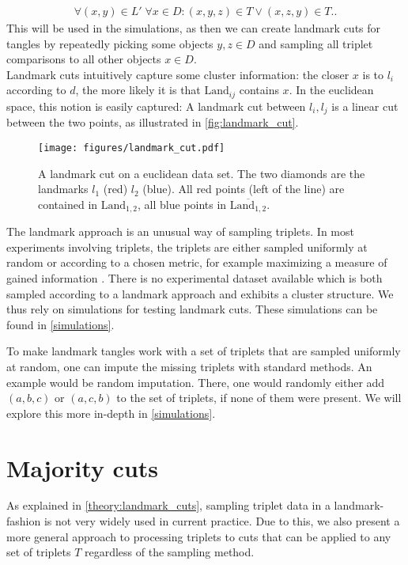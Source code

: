 \begin{align*}
    \forall (x,y) \in L' \; \forall x \in D: (x, y, z) \in T \vee (x, z, y) \in T.
.\end{align*}
This will be used in the simulations, as then we can create landmark cuts for tangles by 
repeatedly picking some objects $y, z \in D$ and sampling all triplet comparisons to all other objects $x \in D$. \\

Landmark cuts intuitively capture some cluster information: 
the closer $x$ is to $l_i$ according to $d$, the more likely it is that $\text{Land}_{ij}$ contains $x$. 
In the euclidean space, this notion is easily captured: A landmark cut between $l_i, l_j$ is
a linear cut between the two points, as illustrated in \autoref{fig:landmark_cut}.

    \begin{figure}[ht]
        \centering
        \texttt{[image: figures/landmark\_cut.pdf]}
        \caption{A landmark cut on a euclidean data set. The two diamonds 
            are the landmarks $l_1$ (red) $l_2$ (blue). All red points (left of the line) 
            are contained in $\text{Land}_{1,2}$, all blue points in $\overline{\text{Land} _{1,2}}$.}
        \label{fig:landmark_cut}
    \end{figure}

The landmark approach is an unusual way of sampling triplets.
In most experiments involving triplets, the triplets are either sampled uniformly at random
\citep{kleindessnerLensDepthFunction2017, haghiriEstimationPerceptualScales2020} 
or according to a chosen metric, for example maximizing a measure of gained information \citep{roadsEnrichingImageNetHuman2021}. 
There is no experimental dataset available which is both sampled according to a landmark approach and exhibits a cluster structure. 
We thus rely on simulations for testing landmark cuts. These simulations can be found in \autoref{simulations}.

To make landmark tangles work with a set of triplets that are sampled uniformly at random, one can impute the missing triplets with standard methods.
An example would be random imputation. There, one would randomly either add $(a,b,c)$ or $(a,c,b)$ to the set of triplets, if none of them were present.
We will explore this more in-depth in \autoref{simulations}.

\section{Majority cuts}\label{theory:majority_cuts}
As explained in \autoref{theory:landmark_cuts}, sampling triplet data in a landmark-fashion is not very widely used in current practice. Due to this, we 
also present a more general approach to processing triplets to cuts that can be applied to any set of triplets $T$ regardless of the sampling method.

